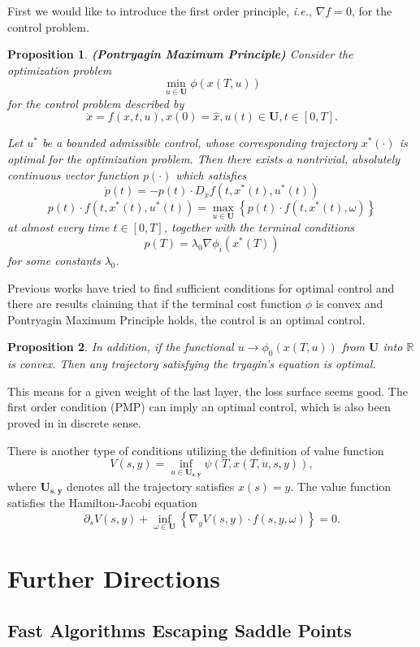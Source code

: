 \documentclass{article}
\theoremstyle{plain}
\newtheorem{prop}{Proposition}
\theoremstyle{definition}
\begin{document}
First we would like to introduce the first order principle, \emph{i.e.}, $\nabla f=0$, for the control problem.
\begin{prop}
	\textbf{(Pontryagin Maximum Principle)} Consider the optimization problem $$\min_{u\in\mathbf{U}} \phi(x(T,u))$$ for the control problem described by
	$$\dot x = f(x,t,u),x(0)=\hat{x},u(t)\in\mathbf{U},t\in [0,T].$$

	Let $u^*$ be a bounded admissible control, whose corresponding trajectory $x^*(\cdot)$ is optimal for the optimization problem. Then there exists a nontrivial, absolutely continuous vector function $p(\cdot)$ which satisfies
	$$\dot{p}(t)=-p(t)\cdot D_xf(t,x^*(t),u^*(t))$$
	$$p(t)\cdot f(t,x^*(t),u^*(t))=\max_{u\in\mathbf{U}}\left\{p(t)\cdot f(t,x^*(t),\omega)\right\}$$
	at almost every time $t\in[0,T]$, together with the terminal conditions
	$$p(T)=\lambda_0\nabla\phi_i(x^*(T))$$
	for some constants $\lambda_0$.
\end{prop}

Previous works have tried to find sufficient conditions for optimal control and there are results claiming that if the terminal cost function $\phi$ is convex and Pontryagin Maximum Principle holds, the control is an optimal control.


\begin{prop}
	In addition, if the functional $u\rightarrow \phi_0(x(T,u))$ from $\mathbf{U}$ into $\mathbb{R}$ is convex. Then any trajectory satisfying the tryagin's equation is optimal.
\end{prop}

This means for a given weight of the last layer, the loss surface seems good. The first order condition (PMP) can imply an optimal control, which is also been proved in \cite{bartlett2018representing} in discrete sense.

There is another type of conditions utilizing the definition of value function
$$V(s,y)=\inf_{u\in\mathbf{U_{s,y}}}\psi(T,x(T,u,s,y)),$$
where $\mathbf{U_{s,y}}$ denotes all the trajectory satisfies $x(s)=y$. The value function satisfies the Hamilton-Jacobi equation $$\partial_sV(s,y)+\inf_{\omega\in\mathbf{U}}\left\{\nabla_yV(s,y)\cdot f(s,y,\omega)\right\}=0.$$

\section{Further Directions}

\subsection{Fast Algorithms Escaping Saddle Points}
\end{document}
